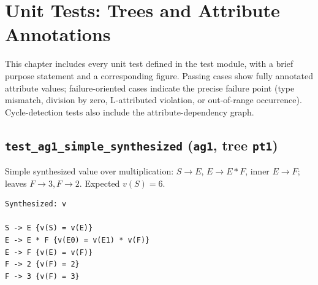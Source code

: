 
%


\section{Unit Tests: Trees and Attribute Annotations}
This chapter includes every unit test defined in the test module, with a brief purpose statement and a corresponding figure. 
Passing cases show fully annotated attribute values; failure-oriented cases indicate the precise failure point (type mismatch, division by zero, L-attributed 
violation, or out-of-range occurrence). Cycle-detection tests also include the attribute-dependency graph. 

\subsection{\texttt{test\_ag1\_simple\_synthesized} (\texttt{ag1}, tree \texttt{pt1})}
Simple synthesized value over multiplication: \(S\to E\), \(E\to E * F\), inner \(E\to F\); leaves \(F\to 3, F\to 2\). Expected \(v(S)=6\). 

\begin{verbatim}
Synthesized: v

S -> E {v(S) = v(E)}
E -> E * F {v(E0) = v(E1) * v(F)}
E -> F {v(E) = v(F)}
F -> 2 {v(F) = 2}
F -> 3 {v(F) = 3}

\end{verbatim}


